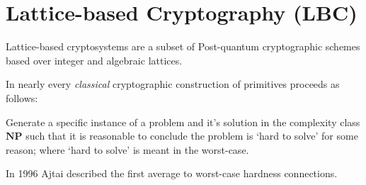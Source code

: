 \section{Lattice-based Cryptography (LBC)} 

Lattice-based cryptosystems are a subset of Post-quantum cryptographic schemes based over integer and algebraic lattices. 

 In nearly every \emph{classical} cryptographic construction of primitives proceeds as follows:


\begin{description}
    Generate a specific instance of a problem and it's solution in the complexity class $\mathbf{NP}$ such that it is reasonable to conclude the problem is `hard to solve' for some reason; where `hard to solve' is meant in the worst-case.
\end{description}


In 1996 Ajtai described the first average to worst-case hardness connections. 

